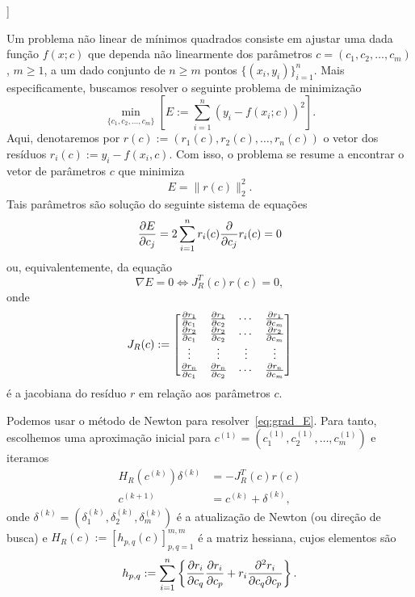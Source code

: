 \begin{flushleft}
  [[tag:revisar]]
\end{flushleft}

Um problema não linear de mínimos quadrados consiste em ajustar uma dada função $f(x;c)$ que dependa não linearmente dos parâmetros $c = (c_1, c_2, \dotsc, c_m)$, $m\geq 1$, a um dado conjunto de $n\geq m$ pontos $\{(x_i, y_i)\}_{i=1}^n$. Mais especificamente, buscamos resolver o seguinte problema de minimização
\begin{equation}\label{eq:prob_nlin_mq}
  \min_{\{c_1, c_2, \dotsc, c_m\}} \left[E := \sum_{i=1}^n \left(y_i - f(x_i;c)\right)^2\right].
\end{equation}
Aqui, denotaremos por $r(c) := (r_1(c), r_2(c), \dotsc, r_n(c))$ o vetor dos resíduos $r_i(c) := y_i - f(x_i,c)$. Com isso, o problema se resume a encontrar o vetor de parâmetros $c$ que minimiza
\begin{equation}
  E = \|r(c)\|_2^2.
\end{equation}
Tais parâmetros são solução do seguinte sistema de equações
\begin{equation}
  \frac{\partial E}{\partial c_j} = 2\sum_{i=1}^n r_i(c)\frac{\partial}{\partial c_j}r_i(c) = 0
\end{equation}
ou, equivalentemente, da equação
\begin{equation}\label{eq:grad_E}
  \nabla E = 0 \Leftrightarrow J_R^T(c)r(c) = 0,
\end{equation}
onde
\begin{equation}
  J_R(c) :=
  \begin{bmatrix}
    \frac{\partial r_1}{\partial c_1} & \frac{\partial r_1}{\partial c_2} & \cdots & \frac{\partial r_1}{\partial c_m}\\
    \frac{\partial r_2}{\partial c_1} & \frac{\partial r_2}{\partial c_2} & \cdots & \frac{\partial r_2}{\partial c_m}\\
    \vdots  & \vdots & \vdots & \vdots \\
    \frac{\partial r_n}{\partial c_1} & \frac{\partial r_n}{\partial c_2} & \cdots & \frac{\partial r_n}{\partial c_m}
  \end{bmatrix}
\end{equation}
é a jacobiana do resíduo $r$ em relação aos parâmetros $c$.

Podemos usar o método de Newton para resolver~\eqref{eq:grad_E}. Para tanto, escolhemos uma aproximação inicial para $c^{(1)} = (c_1^{(1)}, c_2^{(1)}, \dotsc, c_m^{(1)})$ e iteramos
\begin{align}
  H_R(c^{(k)})\delta^{(k)} &= -J_R^T(c)r(c) \label{eq:mqnl_newton1}\\
  c^{(k+1)} &= c^{(k)} + \delta^{(k)} \label{eq:mqnl_newton2},
\end{align}
onde $\delta^{(k)} = (\delta_1^{(k)}, \delta_2^{(k)}, \delta_m^{(k)})$ é a atualização de Newton (ou direção de busca) e $H_R(c) := [h_{p,q}(c)]_{p,q=1}^{m,m}$ é a matriz hessiana, cujos elementos são
\begin{equation}
  h_{p,q} := \sum_{i=1}^n\left\{\frac{\partial r_i}{\partial c_q}\frac{\partial r_i}{\partial c_p} + r_i\frac{\partial^2 r_i}{\partial c_q\partial c_p}\right\}.
\end{equation}

